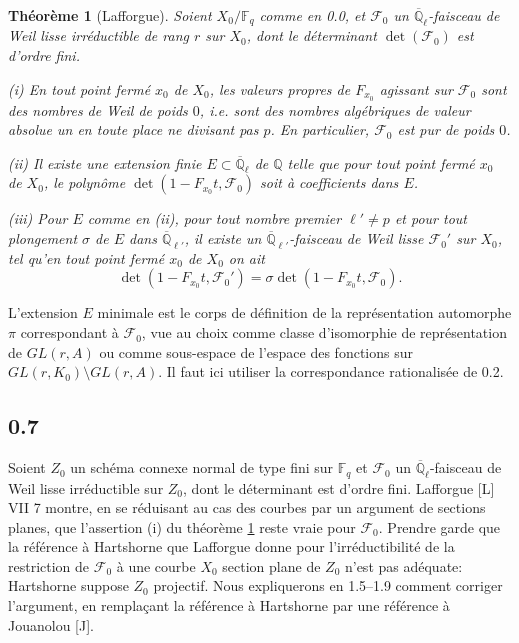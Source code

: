 \documentclass[11pt,a4paper]{article}
\theoremstyle{plain}
\newtheorem{theorem}{Th\'eor\`eme}
\theoremstyle{definition}
\begin{document}
\begin{theorem}[Lafforgue]\label{thm:0.6}
Soient $X_0/\mathbb{F}_q$ comme en 0.0, et $\mathcal{F}_0$ un $\overline{\mathbb{Q}}_\ell$-faisceau de Weil lisse irr\'eductible de rang $r$ sur $X_0$, dont le d\'eterminant $\det(\mathcal{F}_0)$ est d'ordre fini.

\emph{(i)} En tout point ferm\'e $x_0$ de $X_0$, les valeurs propres de $F_{x_0}$ agissant sur $\mathcal{F}_0$ sont des nombres de Weil de poids $0$, i.e. sont des nombres alg\'ebriques de valeur absolue un en toute place ne divisant pas $p$. En particulier, $\mathcal{F}_0$ est pur de poids $0$.

\emph{(ii)} Il existe une extension finie $E \subset \overline{\mathbb{Q}}_\ell$ de $\mathbb{Q}$ telle que pour tout point ferm\'e $x_0$ de $X_0$, le polyn\^ome $\det(1 - F_{x_0}t, \mathcal{F}_0)$ soit \`a coefficients dans $E$.

\emph{(iii)} Pour $E$ comme en (ii), pour tout nombre premier $\ell' \neq p$ et pour tout plongement $\sigma$ de $E$ dans $\overline{\mathbb{Q}}_{\ell'}$, il existe un $\overline{\mathbb{Q}}_{\ell'}$-faisceau de Weil lisse $\mathcal{F}_0'$ sur $X_0$, tel qu'en tout point ferm\'e $x_0$ de $X_0$ on ait
\[
\det(1 - F_{x_0}t, \mathcal{F}_0') = \sigma \det(1 - F_{x_0}t, \mathcal{F}_0).
\]
\end{theorem}

L'extension $E$ minimale est le corps de d\'efinition de la repr\'esentation automorphe $\pi$ correspondant \`a $\mathcal{F}_0$, vue au choix comme classe d'isomorphie de repr\'esentation de $GL(r,A)$ ou comme sous-espace de l'espace des fonctions sur $GL(r,K_0) \setminus GL(r,A)$. Il faut ici utiliser la correspondance rationalis\'ee de 0.2.

\subsection*{0.7}

Soient $Z_0$ un sch\'ema connexe normal de type fini sur $\mathbb{F}_q$ et $\mathcal{F}_0$ un $\overline{\mathbb{Q}}_\ell$-faisceau de Weil lisse irr\'eductible sur $Z_0$, dont le d\'eterminant est d'ordre fini. Lafforgue [L] VII 7 montre, en se r\'eduisant au cas des courbes par un argument de sections planes, que l'assertion (i) du th\'eor\`eme \ref{thm:0.6} reste vraie pour $\mathcal{F}_0$. Prendre garde que la r\'ef\'erence \`a Hartshorne que Lafforgue donne pour l'irr\'eductibilit\'e de la restriction de $\mathcal{F}_0$ \`a une courbe $X_0$ section plane de $Z_0$ n'est pas ad\'equate: Hartshorne suppose $Z_0$ projectif. Nous expliquerons en 1.5--1.9 comment corriger l'argument, en rempla\c{c}ant la r\'ef\'erence \`a Hartshorne par une r\'ef\'erence \`a Jouanolou [J].
\end{document}

